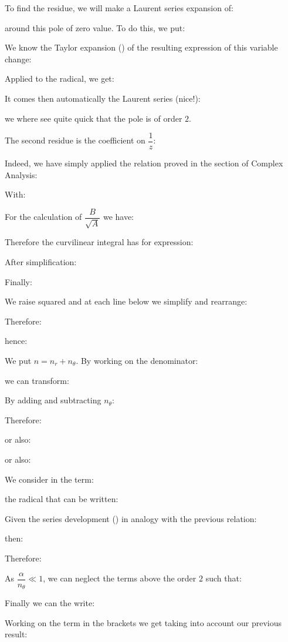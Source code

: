 	To find the residue, we will make a Laurent series expansion of:
	
	around this pole of zero value. To do this, we put:
	
	We know the Taylor expansion () of the resulting expression of this variable change:
	
	Applied to the radical, we get:
	
	It comes then automatically the Laurent series (nice!):
	
	we where see quite quick that the pole is of order $2$.
	
	The second residue is the coefficient on $\dfrac{1}{z}$:
	
	Indeed, we have simply applied the relation proved in the section of Complex Analysis:
	
	
	With:
	
	For the calculation of $\dfrac{B}{\sqrt{A}}$ we have:
	
		Therefore the curvilinear integral has for expression:
	
	After simplification:
	
	Finally:
	
	We raise squared and at each line below we simplify and rearrange:
	
	Therefore:
	
	hence:
	
	We put $n=n_r+n_\theta$. By working on the denominator:
	
	we can transform:
	
	By adding and subtracting $n_\theta$:
	
	Therefore:
	
	or also:
	
	or also:
	
	We consider in the term:
	
	the radical that can be written:
	
	Given the series development () in analogy with the previous relation:
	
	then:
	
	Therefore:
	
	As $\dfrac{\alpha}{n_\theta} \ll 1$, we can neglect the terms above the order $2$ such that:
	
	Finally we can the write:
	
	Working on the term in the brackets we get taking into account our previous result:
	
